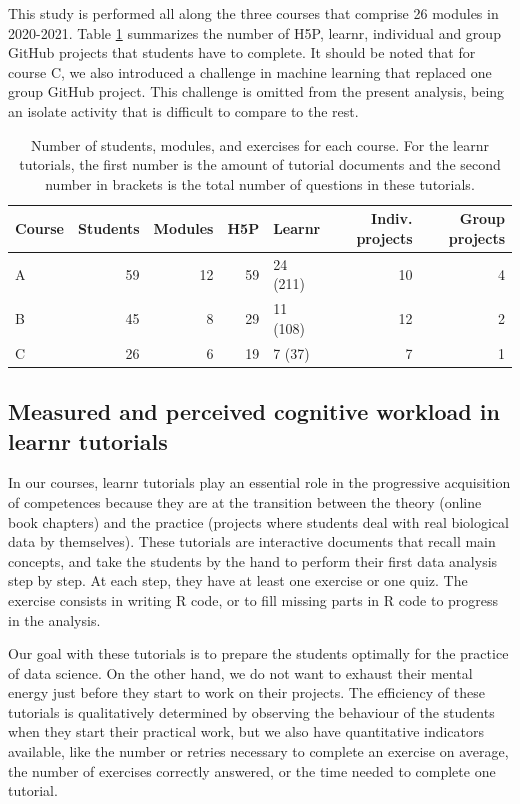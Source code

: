 \documentclass{aims}
\theoremstyle{definition}
\begin{document}
This study is performed all along the three courses that comprise 26
modules in 2020-2021. Table \ref {tab:tab_course} summarizes the number
of H5P, learnr, individual and group GitHub projects that students have
to complete. It should be noted that for course C, we also introduced a
challenge in machine learning that replaced one group GitHub project.
This challenge is omitted from the present analysis, being an isolate
activity that is difficult to compare to the rest.

\begin{table}

\caption{\label{tab:tab_course_summary}\label{tab:tab_course} Number of students, modules, and exercises for each course. For the learnr tutorials, the first number is the amount of tutorial documents and the second number in brackets is the total number of questions in these tutorials.}
\centering
\begin{tabular}[t]{l|r|r|r|l|r|r}
\hline
Course & Students & Modules & H5P & Learnr & Indiv. projects & Group projects\\
\hline
A & 59 & 12 & 59 & 24 (211) & 10 & 4\\
\hline
B & 45 & 8 & 29 & 11 (108) & 12 & 2\\
\hline
C & 26 & 6 & 19 & 7 (37) & 7 & 1\\
\hline
\end{tabular}
\end{table}

\hypertarget{measured-and-perceived-cognitive-workload-in-learnr-tutorials}{%
\subsection{Measured and perceived cognitive workload in learnr
tutorials}\label{measured-and-perceived-cognitive-workload-in-learnr-tutorials}}

In our courses, learnr tutorials play an essential role in the
progressive acquisition of competences because they are at the
transition between the theory (online book chapters) and the practice
(projects where students deal with real biological data by themselves).
These tutorials are interactive documents that recall main concepts, and
take the students by the hand to perform their first data analysis step
by step. At each step, they have at least one exercise or one quiz. The
exercise consists in writing R code, or to fill missing parts in R code
to progress in the analysis.

Our goal with these tutorials is to prepare the students optimally for
the practice of data science. On the other hand, we do not want to
exhaust their mental energy just before they start to work on their
projects. The efficiency of these tutorials is qualitatively determined
by observing the behaviour of the students when they start their
practical work, but we also have quantitative indicators available, like
the number or retries necessary to complete an exercise on average, the
number of exercises correctly answered, or the time needed to complete
one tutorial.
\end{document}
